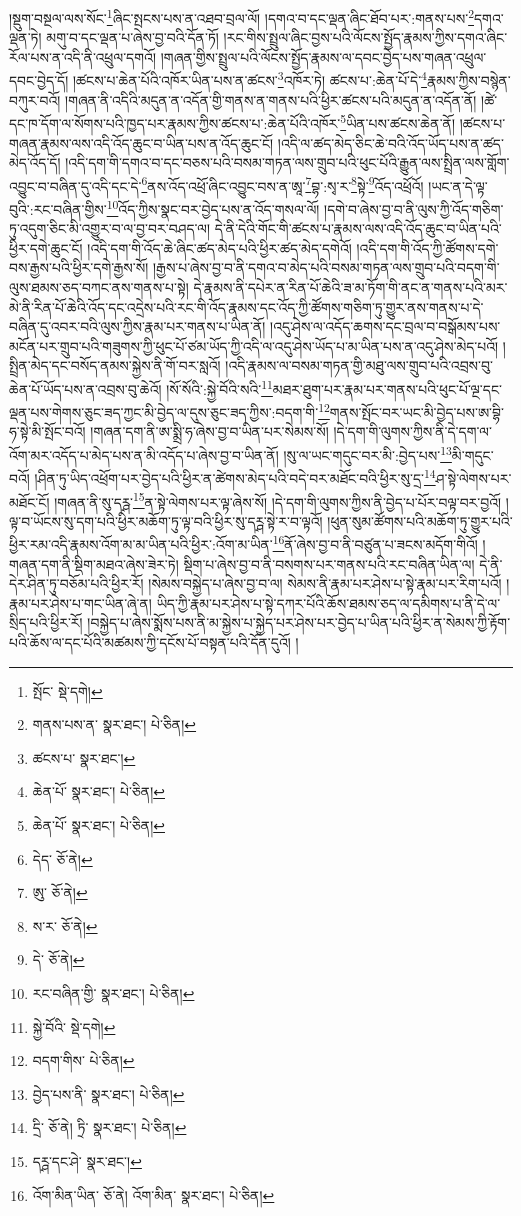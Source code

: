 །སྡུག་བསྔལ་ལས་སོང་\footnote{སྤོང་  སྡེ་དགེ། }ཞིང་སྤངས་པས་ན་འཐབ་བྲལ་ལོ། །དགའ་བ་དང་ལྡན་ཞིང་ཐོབ་པར་:གནས་པས་\footnote{གནས་པས་ན་  སྣར་ཐང་།  པེ་ཅིན། }དགའ་ལྡན་ཏེ། མགུ་བ་དང་ལྡན་པ་ཞེས་བྱ་བའི་དོན་ཏོ། །རང་གིས་སྤྲུལ་ཞིང་བྱས་པའི་ལོངས་སྤྱོད་རྣམས་ཀྱིས་དགའ་ཞིང་རོལ་པས་ན་འདི་ནི་འཕྲུལ་དགའོ། །གཞན་གྱིས་སྤྲུལ་པའི་ལོངས་སྤྱོད་རྣམས་ལ་དབང་བྱེད་པས་གཞན་འཕྲུལ་དབང་བྱེད་དོ། །ཚངས་པ་ཆེན་པོའི་འཁོར་ཡིན་པས་ན་ཚངས་\footnote{ཚངས་པ་  སྣར་ཐང་། }འཁོར་ཏེ། ཚངས་པ་:ཆེན་པོ་དེ་\footnote{ཆེན་པོ་  སྣར་ཐང་།  པེ་ཅིན། }རྣམས་ཀྱིས་བསྙེན་བཀུར་བའོ། །གཞན་ནི་འདིའི་མདུན་ན་འདོན་གྱི་གནས་ན་གནས་པའི་ཕྱིར་ཚངས་པའི་མདུན་ན་འདོན་ནོ། །ཚེ་དང་ཁ་དོག་ལ་སོགས་པའི་ཁྱད་པར་རྣམས་ཀྱིས་ཚངས་པ་:ཆེན་པོའི་འཁོར་\footnote{ཆེན་པོ་  སྣར་ཐང་།  པེ་ཅིན། }ཡིན་པས་ཚངས་ཆེན་ནོ། །ཚངས་པ་གཞན་རྣམས་ལས་འདི་འོད་ཆུང་བ་ཡིན་པས་ན་འོད་ཆུང་ངོ། །འདི་ལ་ཚད་མེད་ཅིང་ཆེ་བའི་འོད་ཡོད་པས་ན་ཚད་མེད་འོད་དོ། །འདི་དག་གི་དགའ་བ་དང་བཅས་པའི་བསམ་གཏན་ལས་གྲུབ་པའི་ཕུང་པོའི་རྒྱུན་ལས་སྤྲིན་ལས་གློག་འབྱུང་བ་བཞིན་དུ་འདི་དང་དེ་\footnote{དེད་  ཅོ་ནེ། }ནས་འོད་འཕྲོ་ཞིང་འབྱུང་བས་ན་ཨཱ་\footnote{ཨུ་  ཅོ་ནེ། }བྷ་:སྭ་ར་\footnote{ས་ར་  ཅོ་ནེ། }སྟེ་\footnote{དེ་  ཅོ་ནེ། }འོད་འཕྲོའོ། །ཡང་ན་དེ་ལྟ་བུའི་:རང་བཞིན་གྱིས་\footnote{རང་བཞིན་གྱི་  སྣར་ཐང་།  པེ་ཅིན། }འོད་ཀྱིས་སྣང་བར་བྱེད་པས་ན་འོད་གསལ་ལོ། །དགེ་བ་ཞེས་བྱ་བ་ནི་ལུས་ཀྱི་འོད་གཅིག་ཏུ་འདུག་ཅིང་མི་འགྱུར་བ་ལ་བྱ་བར་བཤད་ལ། དེ་ནི་དེའི་གོང་གི་ཚངས་པ་རྣམས་ལས་འདི་འོད་ཆུང་བ་ཡིན་པའི་ཕྱིར་དགེ་ཆུང་ངོ། །འདི་དག་གི་འོད་ཆེ་ཞིང་ཚད་མེད་པའི་ཕྱིར་ཚད་མེད་དགེའོ། །འདི་དག་གི་འོད་ཀྱི་ཚོགས་དགེ་བས་རྒྱས་པའི་ཕྱིར་དགེ་རྒྱས་སོ། །རྒྱས་པ་ཞེས་བྱ་བ་ནི་དགའ་བ་མེད་པའི་བསམ་གཏན་ལས་གྲུབ་པའི་བདག་གི་ལུས་ཐམས་ཅད་བཀང་ནས་གནས་པ་སྟེ། དེ་རྣམས་ནི་དཔེར་ན་རིན་པོ་ཆེའི་ཟ་མ་ཏོག་གི་ནང་ན་གནས་པའི་མར་མེ་ནི་རིན་པོ་ཆེའི་འོད་དང་འདྲེས་པའི་རང་གི་འོད་རྣམས་དང་འོད་ཀྱི་ཚོགས་གཅིག་ཏུ་གྱུར་ནས་གནས་པ་དེ་བཞིན་དུ་འབར་བའི་ལུས་ཀྱིས་རྣམ་པར་གནས་པ་ཡིན་ནོ། །འདུ་ཤེས་ལ་འདོད་ཆགས་དང་བྲལ་བ་བསྒོམས་པས་མངོན་པར་གྲུབ་པའི་གཟུགས་ཀྱི་ཕུང་པོ་ཙམ་ཡོད་ཀྱི་འདི་ལ་འདུ་ཤེས་ཡོད་པ་མ་ཡིན་པས་ན་འདུ་ཤེས་མེད་པའོ། །སྤྲིན་མེད་དང་བསོད་ནམས་སྐྱེས་ནི་གོ་བར་སླའོ། །འདི་རྣམས་ལ་བསམ་གཏན་གྱི་མཐུ་ལས་གྲུབ་པའི་འབྲས་བུ་ཆེན་པོ་ཡོད་པས་ན་འབྲས་བུ་ཆེའོ། །སོ་སོའི་:སྐྱེ་བོའི་སའི་\footnote{སྐྱེ་བོའི་  སྡེ་དགེ། }མཐར་ཐུག་པར་རྣམ་པར་གནས་པའི་ཕུང་པོ་ལྔ་དང་ལྡན་པས་གེགས་ཅུང་ཟད་ཀྱང་མི་བྱེད་ལ་དུས་ཅུང་ཟད་ཀྱིས་:བདག་གི་\footnote{བདག་གིས་  པེ་ཅིན། }གནས་སྤོང་བར་ཡང་མི་བྱེད་པས་ཨ་བྷི་ཧ་སྟེ་མི་སྤོང་བའོ། །གཞན་དག་ནི་ཨ་སྨྲི་ཧ་ཞེས་བྱ་བ་ཡིན་པར་སེམས་སོ། །དེ་དག་གི་ལུགས་ཀྱིས་ནི་དེ་དག་ལ་འོག་མར་འདོད་པ་མེད་པས་ན་མི་འདོད་པ་ཞེས་བྱ་བ་ཡིན་ནོ། །སུ་ལ་ཡང་གདུང་བར་མི་:བྱེད་པས་\footnote{བྱེད་པས་ནི་  སྣར་ཐང་།  པེ་ཅིན། }མི་གདུང་བའོ། །ཤིན་ཏུ་ཡིད་འཕྲོག་པར་བྱེད་པའི་ཕྱིར་ན་ཚེགས་མེད་པའི་བདེ་བར་མཐོང་བའི་ཕྱིར་སུ་དྲ་\footnote{དྲི་  ཅོ་ནེ། ཏྲི་  སྣར་ཐང་།  པེ་ཅིན། }ཤ་སྟེ་ལེགས་པར་མཐོང་ངོ། །གཞན་ནི་སུ་དཪྴ་\footnote{དཪྴ་དང་ཤེ་  སྣར་ཐང་། }ན་སྟེ་ལེགས་པར་ལྟ་ཞེས་སོ། །དེ་དག་གི་ལུགས་ཀྱིས་ནི་བྱེད་པ་པོར་བལྟ་བར་བྱའོ། །ལྟ་བ་ཡོངས་སུ་དག་པའི་ཕྱིར་མཆོག་ཏུ་ལྟ་བའི་ཕྱིར་སུ་དཪྴ་སྟེ་ར་བ་ལྟའོ། །ཕུན་སུམ་ཚོགས་པའི་མཆོག་ཏུ་གྱུར་པའི་ཕྱིར་རམ་འདི་རྣམས་འོག་མ་མ་ཡིན་པའི་ཕྱིར་:འོག་མ་ཡིན་\footnote{འོག་མིན་ཡིན་  ཅོ་ནེ། འོག་མིན་  སྣར་ཐང་།  པེ་ཅིན། }ནོ་ཞེས་བྱ་བ་ནི་བཙུན་པ་ཟངས་མདོག་གིའོ། །གཞན་དག་ནི་སྡིག་མཐའ་ཞེས་ཟེར་ཏེ། སྡིག་པ་ཞེས་བྱ་བ་ནི་བསགས་པར་གནས་པའི་རང་བཞིན་ཡིན་ལ། དེ་ནི་དེར་ཤིན་ཏུ་བཅོམ་པའི་ཕྱིར་རོ། །སེམས་བསྐྱེད་པ་ཞེས་བྱ་བ་ལ། སེམས་ནི་རྣམ་པར་ཤེས་པ་སྟེ་རྣམ་པར་རིག་པའོ། །རྣམ་པར་ཤེས་པ་གང་ཡིན་ཞེ་ན། ཡིད་ཀྱི་རྣམ་པར་ཤེས་པ་སྟེ་དཀར་པོའི་ཆོས་ཐམས་ཅད་ལ་དམིགས་པ་ནི་དེ་ལ་སྲིད་པའི་ཕྱིར་རོ། །བསྐྱེད་པ་ཞེས་སྨོས་པས་ནི་མ་སྐྱེས་པ་སྐྱེད་པར་ཤེས་པར་བྱེད་པ་ཡིན་པའི་ཕྱིར་ན་སེམས་ཀྱི་རྟོག་པའི་ཆོས་ལ་དང་པོའི་མཚམས་ཀྱི་དངོས་པོ་བསྟན་པའི་དོན་དུའོ། །
